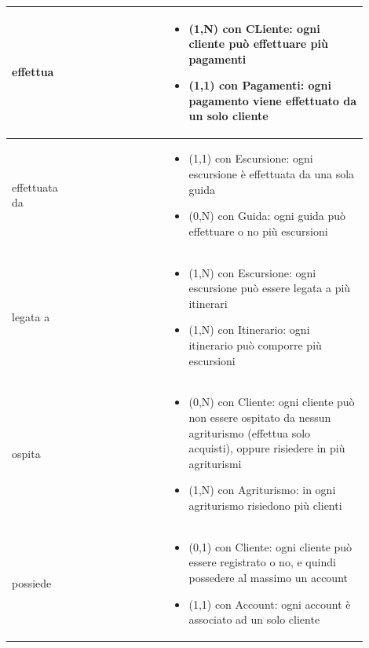 \documentclass[12pt,a4paper]{article}
\begin{document}
\begin{center}
\begin{longtable}{|p{0.16\linewidth}|p{0.24\linewidth}|p{0.50\linewidth}|}
\hline
effettua 				&   
					& \begin{itemize}
						\setlength{\itemindent}{-1em}
						\vspace{-25pt}
						\setlength\itemsep{-0.25em}
						\item (1,N) con CLiente: ogni cliente può effettuare più pagamenti
						\item (1,1) con Pagamenti: ogni pagamento viene effettuato da un solo cliente
					\end{itemize}\\ 

\hline
effettuata da 				&   
					& \begin{itemize}
						\setlength{\itemindent}{-1em}
						\vspace{-25pt}
						\setlength\itemsep{-0.25em}
						\item (1,1) con Escursione: ogni escursione è effettuata da una sola guida
						\item (0,N) con Guida: ogni guida può effettuare o no più escursioni
					\end{itemize}\\ 

\hline
legata a 				&   
					& \begin{itemize}
						\setlength{\itemindent}{-1em}
						\vspace{-25pt}
						\setlength\itemsep{-0.25em}
						\item (1,N) con Escursione: ogni escursione può essere legata a più itinerari
						\item (1,N) con Itinerario: ogni itinerario può comporre più escursioni
					\end{itemize}\\ 

\hline
ospita 				&   
					& \begin{itemize}
						\setlength{\itemindent}{-1em}
						\vspace{-25pt}
						\setlength\itemsep{-0.25em}
						\item (0,N) con Cliente: ogni cliente può non essere ospitato da nessun agriturismo (effettua solo acquisti), oppure risiedere in più agriturismi
						\item (1,N) con Agriturismo: in ogni agriturismo risiedono più clienti
					\end{itemize}\\ 

\hline
possiede 				&   
					& \begin{itemize}
						\setlength{\itemindent}{-1em}
						\vspace{-25pt}
						\setlength\itemsep{-0.25em}
						\item (0,1) con Cliente: ogni cliente può essere registrato o no, e quindi possedere al massimo un account
						\item (1,1) con Account: ogni account è associato ad un solo cliente
					\end{itemize}\\ 


\end{longtable}
\end{center}
\end{document}

